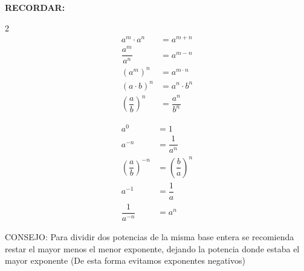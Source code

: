 \documentclass[a4paper,12pt]{article}
\newenvironment{boxsummary}{%
  \def\FrameCommand{\fcolorbox{black}{graybox}}%
  \MakeFramed{\FrameRestore}%
  \small\textbf{RECORDAR:}\par\smallskip
}{%
  \endMakeFramed
}
\begin{document}
\begin{boxsummary}
\begin{multicols}{2}
\begin{align*}
a^m \cdot a^n &= a^{m+n} \\[8pt]
\dfrac{a^m}{a^n} &= a^{m-n} \\[8pt]
\left(a^m\right)^n &= a^{m \cdot n} \\[8pt]
(a \cdot b)^n &= a^n \cdot b^n \\[8pt]
\left(\dfrac{a}{b}\right)^n &= \dfrac{a^n}{b^n}
\end{align*}

\columnbreak

\begin{align*}
a^0 &= 1 \\[8pt]
a^{-n} &= \dfrac{1}{a^n} \\[8pt]
\left(\dfrac{a}{b}\right)^{-n} &= \left(\dfrac{b}{a}\right)^n \\[8pt]
a^{-1} &= \dfrac{1}{a} \\[8pt]
\dfrac{1}{a^{-n}} &= a^n
\end{align*}
\end{multicols}
\end{boxsummary}

CONSEJO: Para dividir dos potencias de la misma base entera se recomienda restar el mayor menos el
menor exponente, dejando la potencia donde estaba el mayor exponente (De esta forma
evitamos exponentes negativos)
\end{document}
